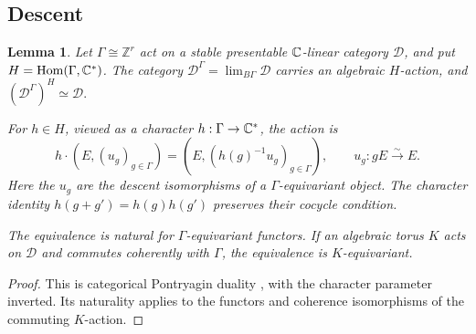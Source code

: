\documentclass[12pt, letter]{amsart}
\newtheorem{lemma}[theorem]{Lemma}
\theoremstyle{definition}
\newcommand{\Z}{\mathbb Z}
\numberwithin{equation}{section}
\begin{document}
\subsection{Descent}

\begin{lemma}\label{lem:character-duality}
Let $\Gamma\cong\Z^r$ act on a stable presentable $\mathbb C$-linear category
$\mathcal D$, and put $H=\operatorname{Hom}(\Gamma,\mathbb C^*)$.
The category $\mathcal D^\Gamma=\lim_{B\Gamma}\mathcal D$ carries
an algebraic $H$-action, and
$(\mathcal D^\Gamma)^H\simeq\mathcal D.$

For $h\in H$, viewed as a character $h:\Gamma\to\mathbb C^*$, the action is
\[
 h\cdot(E,(u_g)_{g\in\Gamma})
   =(E,(h(g)^{-1}u_g)_{g\in\Gamma}),
 \qquad u_g:gE\xrightarrow{\sim}E.
\]
Here the $u_g$ are the descent isomorphisms of a $\Gamma$-equivariant object.
The character identity $h(g+g')=h(g)h(g')$ preserves their cocycle condition.

The equivalence is natural for $\Gamma$-equivariant functors.
If an algebraic torus $K$ acts on $\mathcal D$ and commutes
coherently with $\Gamma$, the equivalence is $K$-equivariant.
\end{lemma}
\begin{proof}
This is categorical Pontryagin duality
\cite[Lemma~9]{ShendeToric}, with the character parameter inverted.
Its naturality applies to the functors and coherence isomorphisms
of the commuting $K$-action.
\end{proof}
\end{document}
